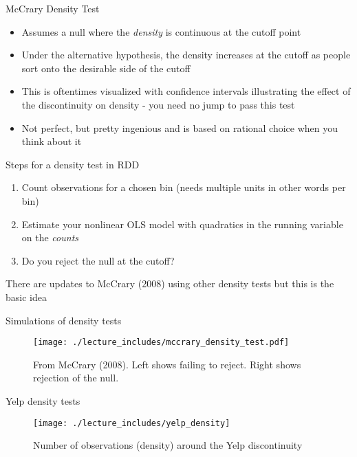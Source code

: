 \documentclass{beamer}
\begin{document}
\begin{frame}{McCrary Density Test}

	\begin{itemize}
	\item Assumes a null where the \emph{density} is continuous at the cutoff point 
	\item Under the alternative hypothesis, the density increases at the cutoff as people sort onto the desirable side of the cutoff
	\item This is oftentimes visualized with confidence intervals illustrating the effect of the discontinuity on density - you need no jump to pass this test
	\item Not perfect, but pretty ingenious and is based on rational choice when you think about it
	\end{itemize}

\end{frame}

\begin{frame}{Steps for a density test in RDD}

		\begin{enumerate}
		\item Count observations for a chosen bin (needs multiple units in other words per bin)
		\item Estimate your nonlinear OLS model with quadratics in the running variable on the \emph{counts}
		\item Do you reject the null at the cutoff?
		\end{enumerate}There are updates to McCrary (2008) using other density tests but this is the basic idea
\end{frame}




\begin{frame}{Simulations of density tests}

	\begin{figure}
	\texttt{[image: ./lecture\_includes/mccrary\_density\_test.pdf]}
	\caption{\scriptsize From McCrary (2008). Left shows failing to reject.  Right shows rejection of the null.}
	\end{figure}

\end{frame}

\begin{frame}{Yelp density tests}
\begin{figure}
    \texttt{[image: ./lecture\_includes/yelp\_density]}
    \caption{Number of observations (density) around the Yelp discontinuity}
\end{figure}


\end{frame}
\end{document}
